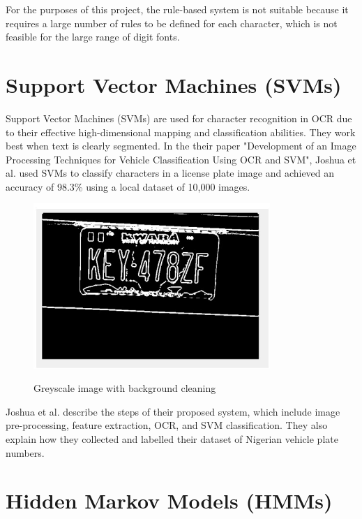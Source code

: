 For the purposes of this project, the rule-based system is not suitable because it requires a large number of rules to be defined for each character, which is not feasible for the large range of digit fonts.


\newpage

\section{Support Vector Machines (SVMs)}

Support Vector Machines (SVMs) are used for character recognition in OCR due to their effective high-dimensional mapping and classification abilities. They work best when text is clearly segmented. In the their paper "Development of an Image Processing Techniques for Vehicle Classification Using OCR and SVM", Joshua et al. used SVMs to classify characters in a license plate image and achieved an accuracy of 98.3\% using a local dataset of 10,000 images.\cite{joshuaDevelopmentImageProcessing2023}

\begin{figure}[ht]
    \centering
    \includegraphics[width=0.8\textwidth]{Figures/SVM_Joshua.jpg}
    \caption[Development of an Image Processing Technique for Vehicle Classification using OCR and SVM]{Greyscale image with background cleaning}\cite{joshuaDevelopmentImageProcessing2023}
    \label{fig:Joshua SVM Paper}
\end{figure}

Joshua et al. describe the steps of their proposed system, which include image pre-processing, feature extraction, OCR, and SVM classification. They also explain how they collected and labelled their dataset of Nigerian vehicle plate numbers.

\newpage

\section{Hidden Markov Models (HMMs)}

